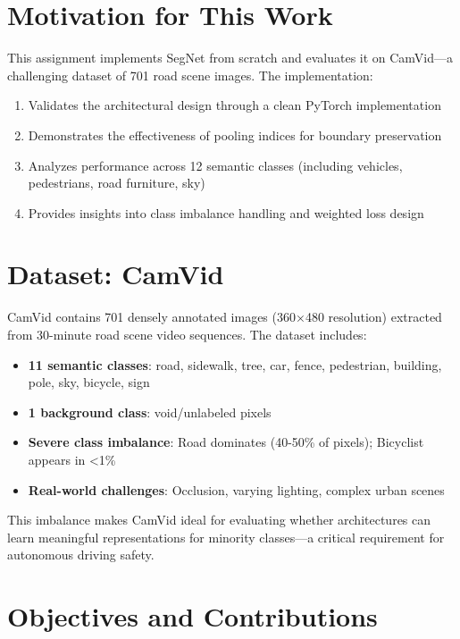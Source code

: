 \documentclass[11pt,a4paper]{report}
\begin{document}
\section*{Motivation for This Work}

This assignment implements SegNet from scratch and evaluates it on CamVid—a challenging dataset of 701 road scene images. The implementation:

\begin{enumerate}
  \item Validates the architectural design through a clean PyTorch implementation
  \item Demonstrates the effectiveness of pooling indices for boundary preservation
  \item Analyzes performance across 12 semantic classes (including vehicles, pedestrians, road furniture, sky)
  \item Provides insights into class imbalance handling and weighted loss design
\end{enumerate}

\section*{Dataset: CamVid}

CamVid contains 701 densely annotated images (360×480 resolution) extracted from 30-minute road scene video sequences. The dataset includes:

\begin{itemize}
  \item \textbf{11 semantic classes}: road, sidewalk, tree, car, fence, pedestrian, building, pole, sky, bicycle, sign
  \item \textbf{1 background class}: void/unlabeled pixels
  \item \textbf{Severe class imbalance}: Road dominates (40-50\% of pixels); Bicyclist appears in <1\%
  \item \textbf{Real-world challenges}: Occlusion, varying lighting, complex urban scenes
\end{itemize}

This imbalance makes CamVid ideal for evaluating whether architectures can learn meaningful representations for minority classes—a critical requirement for autonomous driving safety.

\section*{Objectives and Contributions}
\end{document}
